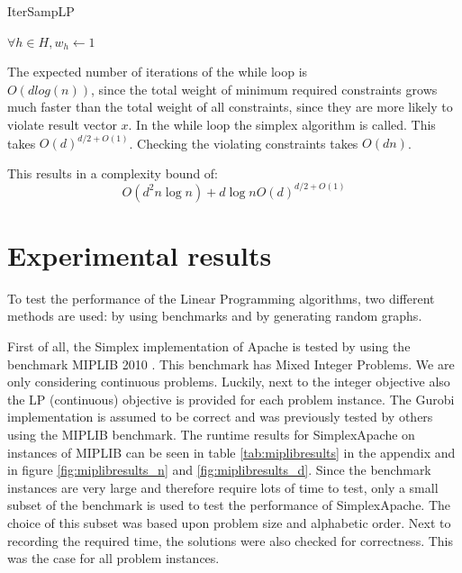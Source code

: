 \documentclass[nocopyrightspace]{acm_proc_article-sp}
\begin{document}
\begin{algorithm}[h]
\label{alg:itersamplp}
\caption{IterSampLP}
$\forall h \in H, w_h \gets 1$ \;
\end{algorithm}

The expected number of iterations of the while loop is \\ $O(d log(n))$, since the total weight of minimum required constraints grows much faster than the total weight of all constraints, since they are more likely to violate result vector $x$. In the while loop the simplex algorithm is called. This takes $O(d)^{d/2+O(1)}$. Checking the violating constraints takes $O(dn)$. 

This results in a complexity bound of:
\begin{equation}
O(d^2n \log{n}) + d \log{n} O(d)^{d/2+O(1)}
\end{equation}
\vfill
\section{Experimental results}
To test the performance of the Linear Programming algorithms, two different methods are used: by using benchmarks and by generating random graphs.

First of all, the Simplex implementation of Apache is tested by using the benchmark MIPLIB 2010 \cite{KochEtAl2011}. This benchmark has Mixed Integer Problems. We are only considering continuous problems. Luckily, next to the integer objective also the LP (continuous) objective is provided for each problem instance. The Gurobi implementation is assumed to be correct and was previously tested by others using the MIPLIB benchmark. The runtime results for SimplexApache on instances of MIPLIB can be seen in table \ref{tab:miplibresults} in the appendix and in figure \ref{fig:miplibresults_n} and \ref{fig:miplibresults_d}. Since the benchmark instances are very large and therefore require lots of time to test, only a small subset of the benchmark is used to test the performance of SimplexApache. The choice of this subset was based upon problem size and alphabetic order. Next to recording the required time, the solutions were also checked for correctness. This was the case for all problem instances. 
\end{document}
